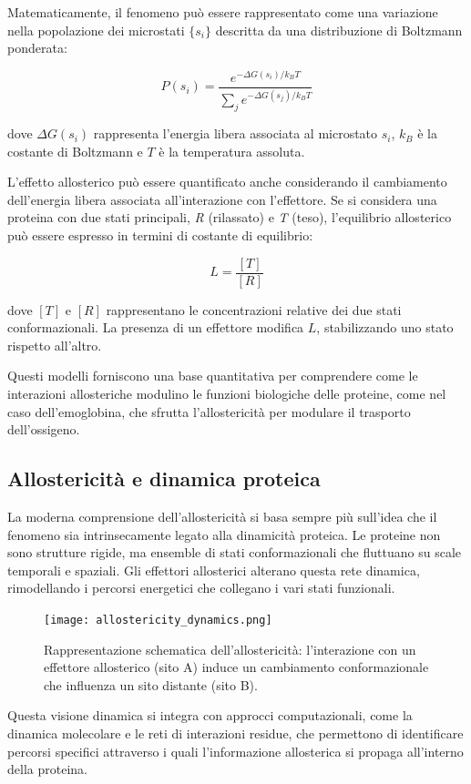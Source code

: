\documentclass[Lau,binding=0.6cm,oneside,noexaminfo]{sapthesis}
\begin{document}
Matematicamente, il fenomeno può essere rappresentato come una variazione nella popolazione dei microstati $\{s_i\}$ descritta da una distribuzione di Boltzmann ponderata:

\[
P(s_i) = \frac{e^{-\Delta G(s_i)/k_B T}}{\sum_{j} e^{-\Delta G(s_j)/k_B T}}
\]

dove $\Delta G(s_i)$ rappresenta l'energia libera associata al microstato $s_i$, $k_B$ è la costante di Boltzmann e $T$ è la temperatura assoluta.

L’effetto allosterico può essere quantificato anche considerando il cambiamento dell’energia libera associata all’interazione con l’effettore. Se si considera una proteina con due stati principali, \emph{R} (rilassato) e \emph{T} (teso), l’equilibrio allosterico può essere espresso in termini di costante di equilibrio:

\[
L = \frac{[T]}{[R]}
\]

dove $[T]$ e $[R]$ rappresentano le concentrazioni relative dei due stati conformazionali. La presenza di un effettore modifica $L$, stabilizzando uno stato rispetto all’altro.

Questi modelli forniscono una base quantitativa per comprendere come le interazioni allosteriche modulino le funzioni biologiche delle proteine, come nel caso dell’emoglobina, che sfrutta l’allostericità per modulare il trasporto dell’ossigeno.

\subsection*{Allostericità e dinamica proteica}
La moderna comprensione dell’allostericità si basa sempre più sull’idea che il fenomeno sia intrinsecamente legato alla dinamicità proteica. Le proteine non sono strutture rigide, ma ensemble di stati conformazionali che fluttuano su scale temporali e spaziali. Gli effettori allosterici alterano questa rete dinamica, rimodellando i percorsi energetici che collegano i vari stati funzionali.

\begin{figure}[h!]
    \centering
    \texttt{[image: allostericity\_dynamics.png]}
    \caption{Rappresentazione schematica dell’allostericità: l’interazione con un effettore allosterico (sito A) induce un cambiamento conformazionale che influenza un sito distante (sito B).}
    \label{fig:allostericity}
\end{figure}

Questa visione dinamica si integra con approcci computazionali, come la dinamica molecolare e le reti di interazioni residue, che permettono di identificare percorsi specifici attraverso i quali l’informazione allosterica si propaga all’interno della proteina.
\end{document}

